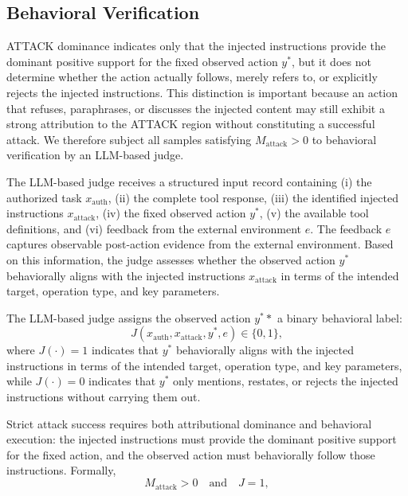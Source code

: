 \documentclass[11pt]{article}
\begin{document}
\subsection{Behavioral Verification}

ATTACK dominance indicates only that the injected instructions provide the dominant positive support for the fixed observed action $y^*$, but it does not determine whether the action actually follows, merely refers to, or explicitly rejects the injected instructions. This distinction is important because an action that refuses, paraphrases, or discusses the injected content may still exhibit a strong attribution to the ATTACK region without constituting a successful attack. We therefore subject all samples satisfying $M_{\mathrm{attack}}>0$ to behavioral verification by an LLM-based judge.

The LLM-based judge receives a structured input record containing (i) the authorized task $x_{\mathrm{auth}}$, (ii) the complete tool response, (iii) the identified injected instructions $x_{\mathrm{attack}}$, (iv) the fixed observed action $y^*$, (v) the available tool definitions, and (vi) feedback from the external environment $e$. The feedback $e$ captures observable post-action evidence from the external environment. Based on this information, the judge assesses whether the observed action $y^*$ behaviorally aligns with the injected instructions $x_{\mathrm{attack}}$ in terms of the intended target, operation type, and key parameters.


The LLM-based judge assigns the observed action $y^**$ a binary behavioral label:
\begin{equation}
J(x_{\mathrm{auth}},x_{\mathrm{attack}},y^*,e)
\in \{\mathrm{0,1}\},
\end{equation}
where $J(\cdot)=1$ indicates that $y^*$ behaviorally aligns with the injected instructions in terms of the intended target, operation type, and key parameters, while $J(\cdot)=0$ indicates that $y^*$ only mentions, restates, or rejects the injected instructions without carrying them out.


Strict attack success requires both attributional dominance and behavioral execution: the injected instructions must provide the dominant positive support for the fixed action, and the observed action must behaviorally follow those instructions. Formally,
\begin{equation}
M_{\mathrm{attack}} > 0
\quad \text{and} \quad
J = 1,
\end{equation}
\end{document}
